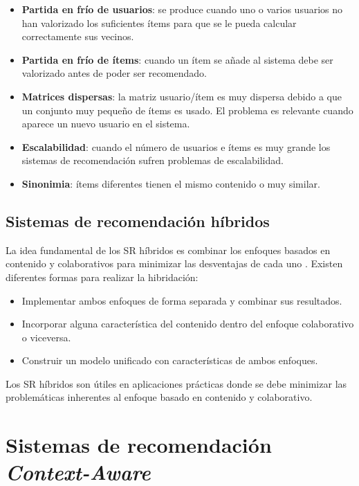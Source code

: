 \begin{itemize}
\item \textbf{Partida en frío de usuarios}: se produce cuando uno o varios usuarios no han valorizado los suficientes ítems para que se le pueda calcular correctamente sus vecinos.
\item \textbf{Partida en frío de ítems}: cuando un ítem se añade al sistema debe ser valorizado antes de poder ser recomendado. 
\item \textbf{Matrices dispersas}: la matriz usuario/ítem es muy dispersa debido a que un conjunto muy pequeño de ítems es usado. El problema es relevante cuando aparece un nuevo usuario en el sistema.
\item \textbf{Escalabilidad}: cuando el número de usuarios e ítems es muy grande los sistemas de recomendación sufren problemas de escalabilidad.
\item \textbf{Sinonimia}: ítems diferentes tienen el mismo contenido o muy similar.
\end{itemize}

\subsection{Sistemas de recomendaci\'on h\'ibridos}
\label{marco:hibridos}

La idea fundamental de los SR híbridos es combinar los enfoques basados en contenido y colaborativos para minimizar las desventajas de cada uno \citep{Burke:2002}. Existen diferentes formas para realizar la hibridación:

\begin{itemize}
	\item Implementar ambos enfoques de forma separada y combinar sus resultados.
	\item Incorporar alguna característica del contenido dentro del enfoque colaborativo o viceversa.
	\item Construir un modelo unificado con características de ambos enfoques.
\end{itemize}

Los SR híbridos son útiles en aplicaciones prácticas donde se debe minimizar las problemáticas inherentes al enfoque basado en contenido y colaborativo.

\section{Sistemas de recomendaci\'on \textit{Context-Aware}}
\label{marco:cars}

